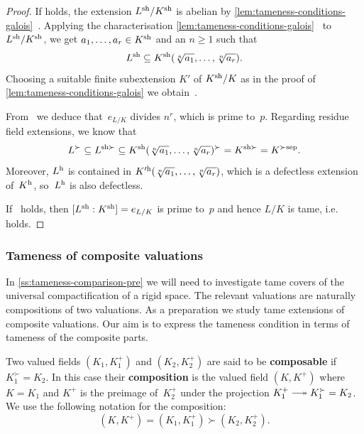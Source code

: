 \begin{proof}
    If  holds, the extension $L^{\rm sh}/K^{\rm sh}$ is abelian by \cref{lem:tameness-conditions-galois}~.
    Applying the characterisation 
    \cref{lem:tameness-conditions-galois}~ to $L^{\rm sh}/K^{\rm sh}$, we get $a_1,\ldots,a_r \in K^{\rm sh}$ and an 
    $n \ge 1$ such that
    \[
        L^{\rm sh} \subseteq K^{\rm sh}(\sqrt[n]{a_1}, \ldots, \sqrt[n]{a_r}).
    \]
    Choosing a suitable finite subextension $K'$ of $K^{\rm sh}/K$ as in the proof of \cref{lem:tameness-conditions-galois} we obtain~. 

    From~ we deduce that~$e_{L/K}$ divides $n^r$, which is prime to~$p$.
    Regarding residue field extensions, we know that
    \[
        L^\succ \subseteq L^{{\rm sh}\succ} \subseteq K^{\rm sh}(\sqrt[n]{a_1}, \ldots, \sqrt[n]{a_r})^\succ = K^{{\rm sh}\succ} = K^{\succ{\rm sep}}.
    \]
    Moreover, $L^{\rm h}$ is contained in $K'^{\rm h}(\sqrt[n]{a_1}, \ldots, \sqrt[n]{a_r})$, which is a defectless extension of~$K^{\rm h}$, so~$L^{\rm h}$ is also defectless.

    If~ holds, then $[L^{\rm sh}:K^{\rm sh}] = e_{L/K}$ is prime to~$p$ and hence $L/K$ is tame, i.e.\  holds.
\end{proof}


\subsubsection*{Tameness of composite valuations}

In \cref{ss:tameness-comparison-pre} we will need to investigate tame covers of the universal compactification of a rigid space.
The relevant valuations are naturally compositions of two valuations.
As a preparation we study tame extensions of composite valuations.
Our aim is to express the tameness condition in terms of tameness of the composite parts.


\begin{defi}
    Two valued fields $(K_1,K_1^+)$ and $(K_2,K_2^+)$ are said to be \textbf{composable} if $K_1^\succ = K_2$.
    In this case their \textbf{composition} is the valued field $(K,K^+)$ where $K = K_1$ and $K^+$ is the preimage of~$K_2^+$ under the projection $K_1^+ \surj K_1^\succ = K_2$.
    We use the following notation for the composition:
    \[
        (K,K^+) = (K_1,K_1^+) \succ (K_2,K_2^+).
    \]
\end{defi}

